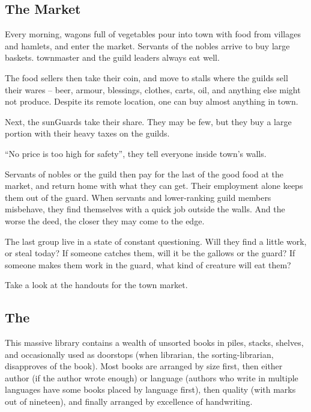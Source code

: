 \begin{multicols}{2}

\subsection{The Market}
\label{greyMarket}

Every morning, wagons full of vegetables pour into \gls{town} with food from \glspl{village} and hamlets, and enter the market.
Servants of the nobles arrive to buy large baskets.
\Gls{townmaster} and the guild leaders always eat well.

The food sellers then take their coin, and move to stalls where the guilds sell their wares -- beer, armour, blessings, clothes, carts, oil, and anything else  might not produce.
Despite its remote location, one can buy almost anything in \gls{town}.

Next, the \glspl{sunGuard} take their share.
They may be few, but they buy a large portion with their heavy taxes on the guilds.

``No price is too high for safety'', they tell everyone inside \gls{town}'s walls.

Servants of nobles or the guild then pay for the last of the good food at the market, and return home with what they can get.
Their employment alone keeps them out of the \gls{guard}.
When servants and lower-ranking guild members misbehave, they find themselves with a quick job outside the walls.
And the worse the deed, the closer they may come to the \gls{edge}.

The last group live in a state of constant questioning.
Will they find a little work, or steal today?
If someone catches them, will it be the gallows or the guard?
If someone makes them work in the \gls{guard}, what kind of creature will eat them?

Take a look at the handouts for the \gls{town} market.

\subsection{The }
\label{paperGuild}

This massive library contains a wealth of unsorted books in piles, stacks, shelves, and occasionally used as doorstops (when \gls{librarian}, the sorting-librarian, disapproves of the book).
Most books are arranged by size first, then either author (if the author wrote enough) or language (authors who write in multiple languages have some books placed by language first), then quality (with marks out of nineteen), and finally arranged by excellence of handwriting.


\end{multicols}
